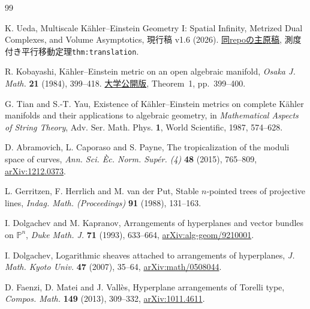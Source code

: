 \documentclass[11pt,a4paper]{ltjsarticle}
\newcommand{\PP}{\mathbb P}
\theoremstyle{plain}
\theoremstyle{definition}
\theoremstyle{remark}
\begin{document}
\begin{thebibliography}{99}
\footnotesize

K. Ueda,
\newblock Multiscale K\"ahler--Einstein Geometry I:
Spatial Infinity, Metrized Dual Complexes, and Volume Asymptotics,
\newblock 現行稿 v1.6 (2026).
\newblock \href{https://github.com/uedakazushi/multiscale-kaehler-einstein/blob/main/papers/multiscale-kaehler-einstein.tex}{同repoの主原稿},
測度付き平行移動定理\texttt{thm:translation}.

R. Kobayashi,
\newblock K\"ahler--Einstein metric on an open algebraic manifold,
\newblock \emph{Osaka J. Math.} \textbf{21} (1984), 399--418.
\newblock \href{https://ir.library.osaka-u.ac.jp/repo/ouka/all/6442/ojm21_02_12.pdf}{大学公開版},
Theorem~1, pp.~399--400.

G. Tian and S.-T. Yau,
\newblock Existence of K\"ahler--Einstein metrics on complete K\"ahler manifolds and their applications to algebraic geometry,
\newblock in \emph{Mathematical Aspects of String Theory}, Adv. Ser. Math. Phys. \textbf{1}, World Scientific, 1987, 574--628.

D. Abramovich, L. Caporaso and S. Payne,
\newblock The tropicalization of the moduli space of curves,
\newblock \emph{Ann. Sci. \`Ec. Norm. Sup\'er. (4)} \textbf{48} (2015), 765--809,
\newblock \href{https://arxiv.org/abs/1212.0373}{arXiv:1212.0373}.

L. Gerritzen, F. Herrlich and M. van der Put,
\newblock Stable $n$-pointed trees of projective lines,
\newblock \emph{Indag. Math. (Proceedings)} \textbf{91} (1988), 131--163.

I. Dolgachev and M. Kapranov,
\newblock Arrangements of hyperplanes and vector bundles on $\PP^n$,
\newblock \emph{Duke Math. J.} \textbf{71} (1993), 633--664,
\newblock \href{https://arxiv.org/abs/alg-geom/9210001}{arXiv:alg-geom/9210001}.

I. Dolgachev,
\newblock Logarithmic sheaves attached to arrangements of hyperplanes,
\newblock \emph{J. Math. Kyoto Univ.} \textbf{47} (2007), 35--64,
\newblock \href{https://arxiv.org/abs/math/0508044}{arXiv:math/0508044}.

D. Faenzi, D. Matei and J. Vall\`es,
\newblock Hyperplane arrangements of Torelli type,
\newblock \emph{Compos. Math.} \textbf{149} (2013), 309--332,
\newblock \href{https://arxiv.org/abs/1011.4611}{arXiv:1011.4611}.


\end{thebibliography}
\end{document}
